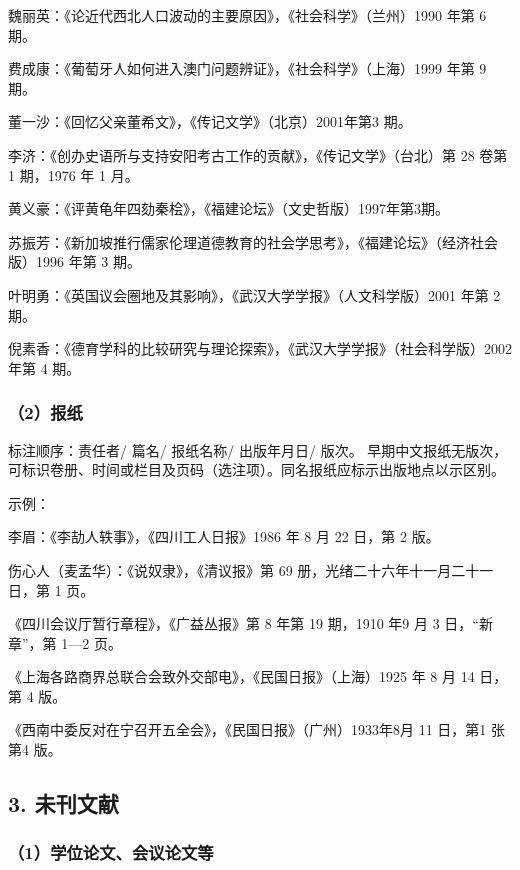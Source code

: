\documentclass{article}
\begin{document}
魏丽英：《论近代西北人口波动的主要原因》，《社会科学》（兰州）1990 年第 6 期。

费成康：《葡萄牙人如何进入澳门问题辨证》，《社会科学》（上海）1999 年第 9 期。

董一沙：《回忆父亲董希文》，《传记文学》（北京）2001年第3 期。

李济：《创办史语所与支持安阳考古工作的贡献》，《传记文学》（台北）第 28 卷第 1 期，1976 年 1 月。

黄义豪：《评黄龟年四劾秦桧》，《福建论坛》（文史哲版）1997年第3期。

苏振芳：《新加坡推行儒家伦理道德教育的社会学思考》，《福建论坛》（经济社会版）1996 年第 3 期。

叶明勇：《英国议会圈地及其影响》，《武汉大学学报》（人文科学版）2001 年第 2 期。

倪素香：《德育学科的比较研究与理论探索》，《武汉大学学报》（社会科学版）2002 年第 4 期。

\subsubsection*{（2）报纸}

标注顺序：责任者/ 篇名/ 报纸名称/ 出版年月日/ 版次。
早期中文报纸无版次，可标识卷册、时间或栏目及页码（选注项）。同名报纸应标示出版地点以示区别。

示例：

李眉：《李劼人轶事》，《四川工人日报》1986 年 8 月 22 日，第 2 版。

伤心人（麦孟华）：《说奴隶》，《清议报》第 69 册，光绪二十六年十一月二十一日，第 1 页。

《四川会议厅暂行章程》，《广益丛报》第 8 年第 19 期，1910 年9 月 3 日，“新章”，第 1—2 页。

《上海各路商界总联合会致外交部电》，《民国日报》（上海）1925 年 8 月 14 日，第 4 版。

《西南中委反对在宁召开五全会》，《民国日报》（广州）1933年8月 11 日，第1 张第4 版。

\subsection*{ 3.  未刊文献}

\subsubsection*{（1）学位论文、会议论文等}
\end{document}
